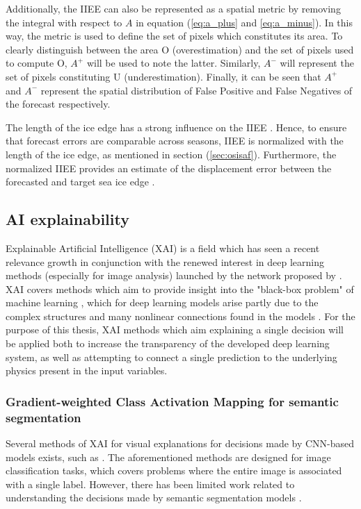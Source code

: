 \documentclass[../main/thesis.tex]{subfiles}
\begin{document}
Additionally, the IIEE can also be represented as a spatial metric by removing the integral with respect to $A$ in equation (\ref{eq:a_plus} and \ref{eq:a_minus}). In this way, the metric is used to define the set of pixels which constitutes its area. To clearly distinguish between the area O (overestimation) and the set of pixels used to compute O, $A^+$ will be used to note the latter. Similarly, $A^-$ will represent the set of pixels constituting U (underestimation). Finally, it can be seen that $A^+$ and $A^-$ represent the spatial distribution of False Positive and False Negatives of the forecast respectively.

The length of the ice edge has a strong influence on the IIEE \citep{Goessling2018,Palerme2019}. Hence, to ensure that forecast errors are comparable across seasons, IIEE is normalized with the length of the ice edge, as mentioned in section (\ref{sec:osisaf}). Furthermore, the normalized IIEE provides an estimate of the displacement error between the forecasted and target sea ice edge \citep{Melsom2019}.

\subsection{AI explainability}
Explainable Artificial Intelligence (XAI) is a field which has seen a recent relevance growth in conjunction with the renewed interest in deep learning methods (especially for image analysis) launched by the network proposed by \citet{Krizhevsky2012}. XAI covers methods which aim to provide insight into the "black-box problem" of machine learning \citep{Adadi2018}, which for deep learning models arise partly due to the complex structures and many nonlinear connections found in the models \citep{Lopes2022}. For the purpose of this thesis, XAI methods which aim explaining a single decision will be applied both to increase the transparency of the developed deep learning system, as well as attempting to connect a single prediction to the underlying physics present in the input variables.

\subsubsection{Gradient-weighted Class Activation Mapping for semantic segmentation}
\label{sec:seg-grad-cam}
Several methods of XAI for visual explanations for decisions made by CNN-based models exists, such as \citep{Simonyan2013,Zhou2016,Selvaraju2016,Sundararajan2017,Lundberg2017}. The aforementioned methods are designed for image classification tasks, which covers problems where the entire image is associated with a single label. However, there has been limited work related to understanding the decisions made by semantic segmentation models \citep{Linardatos2020}.
\end{document}
